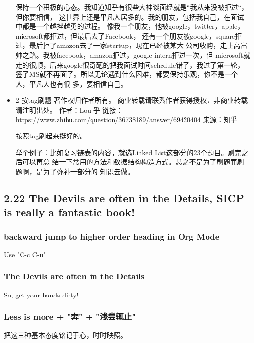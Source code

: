 \documentclass[11pt]{article}
\begin{document}
\begin{itemize}
保持一个积极的心态。我知道知乎有很些大神谈面经就是“我从来没被拒过“，但你要相信，
这世界上还是平凡人居多的。我的朋友，包括我自己，在面试中都是一个越挫越勇的过程。
像我一个朋友，他被google，twitter，apple，microsoft都拒过，但最后去了Facebook，
还有一个朋友被google，square拒过，最后拒了amazon去了一家startup，现在已经被某大
公司收购，走上高富帅之路。我被facebook，amazon拒过，google intern拒过一次，但
microsoft就走的很顺，后来google很奇葩的把我面试时间schedule错了，我过了第一轮，
签了MS就不再面了。所以无论遇到什么困难，都要保持乐观，你不是一个人，平凡人也有很
多，要相信自己。
\item 2 按tag刷题
\label{sec:orgheadline109}
著作权归作者所有。
商业转载请联系作者获得授权，非商业转载请注明出处。
作者：Lou 乎
链接：\url{https://www.zhihu.com/question/36738189/answer/69420404}
来源：知乎

按照tag刷起来挺好的。

举个例子：比如复习链表的内容，就选Linked List这部分的23个题目。刷完之后可以再总
结一下常用的方法和数据结构构造方式。总之不是为了刷题而刷题啊，是为了弥补一部分的
知识去做。
\end{itemize}
\subsection*{2.22 The \textbf{Devils} are often in the \textbf{Details}, SICP is really a fantastic book!}
\label{sec:orgheadline117}

\subsubsection*{backward jump to higher order heading in Org Mode}
\label{sec:orgheadline112}
Use "C-c C-u"

\subsubsection*{The \textbf{Devils} are often in the \textbf{Details}}
\label{sec:orgheadline113}
So, get your hands dirty!

\subsubsection*{\textbf{Less is more} + "奔" + "浅尝辄止"}
\label{sec:orgheadline114}
把这三种基本态度铭记于心，时时映照。
\end{document}
